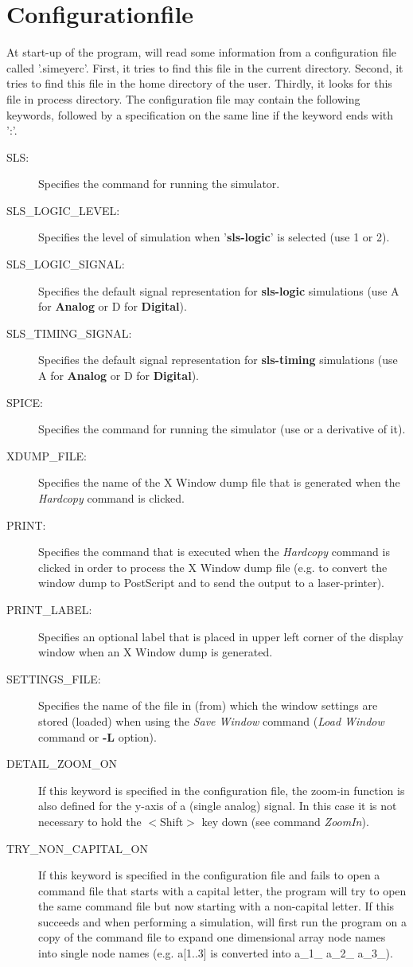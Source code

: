 \section{Configurationfile}
At start-up of the program,
will read some information from a configuration
file called '.simeyerc'.
First, it tries to find this file in the current directory.
Second, it tries to find this file in the home directory of the user.
Thirdly, it looks for this file in process directory.
The configuration file may contain the following keywords, followed
by a specification on the same line if the keyword ends with ':'.

\begin{description}
\item [SLS:]
Specifies the command for running the
simulator.
\item[SLS\_LOGIC\_LEVEL:]
Specifies the level of simulation when '{\bf sls-logic}' is selected
(use 1 or 2).
\item [SLS\_LOGIC\_SIGNAL:]
Specifies the default signal representation for {\bf sls-logic} simulations
(use A for {\bf Analog} or D for {\bf Digital}).
\item [SLS\_TIMING\_SIGNAL:]
Specifies the default signal representation for {\bf sls-timing} simulations
(use A for {\bf Analog} or D for {\bf Digital}).
\item [SPICE:]
Specifies the command for running the
simulator (use
or a derivative of it).
\item [XDUMP\_FILE:]
Specifies the name of the X Window dump file that is generated
when the {\it Hardcopy} command is clicked.
\item [PRINT:]
Specifies the command that is executed
when the {\it Hardcopy} command is clicked
in order to process the X Window dump file (e.g. to convert the window dump to
PostScript and to send the output to a laser-printer).
\item [PRINT\_LABEL:]
Specifies an optional label that is placed in upper left corner
of the display window when an X Window dump is generated.
\item [SETTINGS\_FILE:]
Specifies the name of the file in (from)
which the window settings are stored (loaded) when using
the {\it Save Window} command ({\it Load Window} command or {\bf -L} option).
\item [DETAIL\_ZOOM\_ON]
If this keyword is specified in the configuration file,
the zoom-in function is also defined for the
y-axis of a (single analog) signal.
In this case it is not necessary to hold the $<$Shift$>$ key down
(see command {\it ZoomIn}).
\item [TRY\_NON\_CAPITAL\_ON]
If this keyword is specified in the configuration file
and  fails to open a command file that starts with a capital letter,
the program will try to open the same command file but now starting
with a non-capital letter.
If this succeeds and
when performing a simulation,  will first run the program 
on a copy of the command file
to expand one dimensional array node names into single node names
(e.g. a[1..3] is converted into a\_1\_ a\_2\_ a\_3\_).
\end{description}
